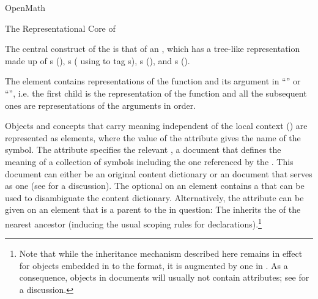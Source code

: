 \begin{omgroup}[id=mobj,short=Mathematical Objects]
\begin{omgroup}[id=openmath]{OpenMath}
\begin{module}[id=OpenMath]
\begin{omgroup}[id=om.core]{The Representational Core of {\openmath}}

\begin{definition}[id=omcore.def]
  The central construct of the {\openmath} is that of an {}, which has a tree-like representation made up of
  {s} ({}), {s}
  ({} using {} to tag
  {s}), {s} ({}), and
  {s} ({}).
\end{definition}

The {} element contains representations of the function and its
argument in ``'' or ``{}'',
i.e. the first child is the representation of the function and all the subsequent ones are
representations of the arguments in order.

Objects and concepts that carry meaning independent of the local context () are represented as
{} elements, where the value of the
{} attribute gives the name of the symbol.  The
{} attribute specifies the relevant {}, a document that defines the meaning of a collection of symbols including
the one referenced by the {}.  This document can either be an
original {\openmath} content dictionary or an {\omdoc} document that serves as one (see
{} for a discussion). The optional {} on
an {} element contains a {} that can be used to
disambiguate the content dictionary.  Alternatively, the {}
attribute can be given on an {\openmath} element that is a parent to the
{} in question: The {} inherits the
{} of the nearest ancestor (inducing the usual {\xml} scoping rules
for declarations).\footnote{Note that while the {} inheritance
  mechanism described here remains in effect for {\openmath} objects embedded in to the
  {\omdoc} format, it is augmented by one in {\omdoc}. As a consequence, {\openmath}
  objects in {\omdoc} documents will usually not contain {}
  attributes; see {} for a discussion.}


\end{omgroup}
\end{module}
\end{omgroup}
\end{omgroup}
